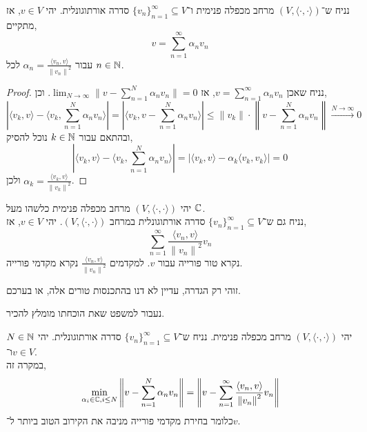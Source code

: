 \begin{theorem}
	נניח ש־$(V, \langle \cdot, \cdot \rangle)$ מרחב מכפלה פנימית ו־${\{ v_n \}}_{n = 1}^\infty \subseteq V$ סדרה אורתוגונלית.
	יהי $v \in V$, אז מתקיים,
	\[
		v = \sum_{n = 1}^\infty \alpha_n v_n
	\]
	עבור $\alpha_n = \frac{\langle v_n, v \rangle}{{\lVert v_n \rVert}^2}$ לכל $n \in \mathbb{N}$.
\end{theorem}
\begin{proof}
	נניח שאכן $v = \sum_{n = 1}^\infty \alpha_n v_n$, אז $\lim_{N \to \infty} \lVert v - \sum_{n = 1}^N \alpha_n v_n \rVert = 0$.
	וכן,
	\[
		\left\lvert \langle v_k, v \rangle - \langle v_k, \sum_{n = 1}^N \alpha_n v_n \rangle \right\rvert
		= \left\lvert \langle v_k, v - \sum_{n = 1}^N \alpha_n v_n \rangle \right\rvert
		\le \lVert v_k \rVert \cdot \left\lVert v - \sum_{n = 1}^N \alpha_n v_n \right\rVert \xrightarrow{N \to \infty} 0
	\]
	ובהתאם עבור $k \in \mathbb{N}$ נוכל להסיק,
	\[
		\left\lvert \langle v_k, v \rangle - \langle v_k, \sum_{n = 1}^N \alpha_n v_n \rangle \right\rvert
		= | \langle v_k, v \rangle - \alpha_k \langle v_k, v_k \rangle|
		= 0
	\]
	ולכן $\alpha_k = \frac{\langle v_k, v \rangle}{{\lVert v_k \rVert}^2}$.
\end{proof}
\begin{definition}
	יהי $(V, \langle \cdot, \cdot \rangle)$ מרחב מכפלה פנימית כלשהו מעל $\mathbb{C}$. \\
	נניח גם ש־${\{ v_n \}}_{n = 1}^\infty \subseteq V$ סדרה אורתוגונלית במרחב $(V, \langle \cdot, \cdot \rangle)$.
	יהי $v \in V$, אז,
	\[
		\sum_{n = 1}^\infty \frac{\langle v_n, v \rangle}{{\lVert v_n \rVert}^2} v_n
	\]
	נקרא טור פורייה עבור $v$.
	למקדמים $\frac{\langle v_n, v \rangle}{{\lVert v_n \rVert}^2}$ נקרא מקדמי פורייה.
\end{definition}
\begin{remark}
	זוהי רק הגדרה, עדיין לא דנו בהתכנסות טורים אלה, או בערכם.
\end{remark}
נעבור למשפט שאת הוכחתו מומלץ להכיר.
\begin{theorem}
	יהי $(V, \langle \cdot, \cdot \rangle)$ מרחב מכפלה פנימית.
	נניח ש־${\{ v_n \}}_{n = 1}^\infty \subseteq V$ סדרה אורתוגונלית.
	יהי $N \in \mathbb{N}$ ו־$v \in V$. \\
	במקרה זה,
	\[
		\min_{\alpha_i \in \mathbb{C}, i \le N} \left\lVert v - \sum_{n = 1}^N \alpha_n v_n \right\rVert
		= \left\lVert v - \sum_{n = 1}^\infty \frac{\langle v_n, v \rangle}{{\lVert v_n \rVert}^2} v_n \right\rVert
	\]
	כלומר בחירת מקדמי פורייה מניבה את הקירוב הטוב ביותר ל־$v$.
\end{theorem}
